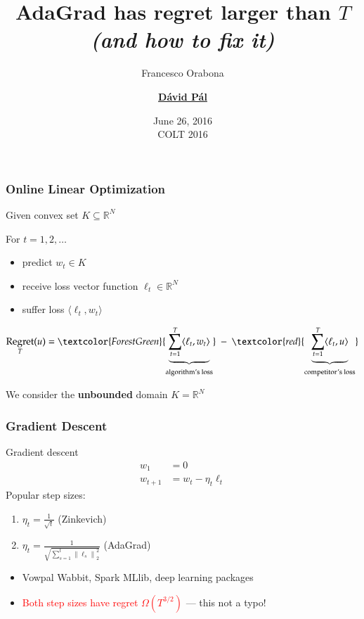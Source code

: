 \documentclass[usenames,dvipsnames]{beamer}
\title{AdaGrad has regret larger than $T$ \\ \textit{(and how to fix it)}}
\date{June 26, 2016 \\ \tiny COLT 2016}
\author{Francesco Orabona \and \underline{\textbf{D\'avid P\'al}}}
\institute{Yahoo Research, New York}
\DeclareMathOperator{\Regret}{Regret}
\newcommand{\R}{\mathbb{R}}
\newcommand{\norm}[1]{\left\|#1\right\|}
\begin{document}
\begin{frame}
\maketitle
\end{frame}

\begin{frame}
\frametitle{Online Linear Optimization}

Given convex set $K \subseteq \R^N$

\vspace{0.3cm}

For $t=1,2,\dots$
\begin{itemize}
\item predict $w_t \in K$
\item receive loss vector function $\ell_t \in \R^N$
\item suffer loss $\langle \ell_t, w_t \rangle$
\end{itemize}

\vspace{0.3cm}
$$
\Regret_T(u) = \textcolor{ForestGreen}{\underbrace{\sum_{t=1}^T \langle \ell_t, w_t \rangle}_{\text{algorithm's loss}}} \ - \ \textcolor{red}{\underbrace{\sum_{t=1}^T \langle \ell_t, u \rangle}_{\text{competitor's loss}}}
$$

\vspace{0.3cm}

We consider the \textbf{unbounded} domain $K = \R^N$
\end{frame}

\begin{frame}
\frametitle{Gradient Descent}

Gradient descent
\begin{align*}
w_1 & = 0 \\
w_{t+1} & = w_t - \eta_t \ell_t
\end{align*}
Popular step sizes:
\begin{enumerate}
\item $\eta_t = \frac{1}{\sqrt{t}}$ \qquad \qquad \qquad (Zinkevich)
\item $\eta_t = \frac{1}{\sqrt{\sum_{s=1}^t \norm{\ell_s}_2^2}}$ \quad \qquad (AdaGrad)
\end{enumerate}

\vspace{1cm}

\begin{itemize}
\item Vowpal Wabbit, Spark MLlib, deep learning packages
\item \textcolor{red}{Both step sizes have regret $\Omega(T^{3/2})$} --- this not a typo!
\end{itemize}
\end{frame}
\end{document}
